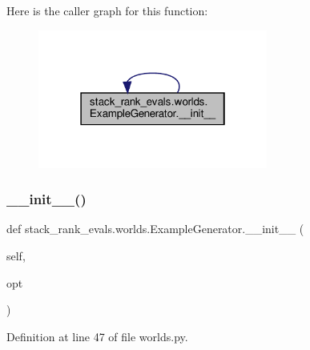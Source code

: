 Here is the caller graph for this function\+:
\nopagebreak
\begin{figure}[H]
\begin{center}
\leavevmode
\includegraphics[width=214pt]{classstack__rank__evals_1_1worlds_1_1ExampleGenerator_a6b15b72b85a0358bb6c171ef6b183c9d_icgraph}
\end{center}
\end{figure}
\mbox{\label{classstack__rank__evals_1_1worlds_1_1ExampleGenerator_a6b15b72b85a0358bb6c171ef6b183c9d}} 
\subsubsection{\texorpdfstring{\+\_\+\+\_\+init\+\_\+\+\_\+()}{\_\_init\_\_()}\hspace{0.1cm}{\footnotesize\ttfamily [2/2]}}
{\footnotesize\ttfamily def stack\+\_\+rank\+\_\+evals.\+worlds.\+Example\+Generator.\+\_\+\+\_\+init\+\_\+\+\_\+ (\begin{DoxyParamCaption}\item[{}]{self,  }\item[{}]{opt }\end{DoxyParamCaption})}



Definition at line 47 of file worlds.\+py.




